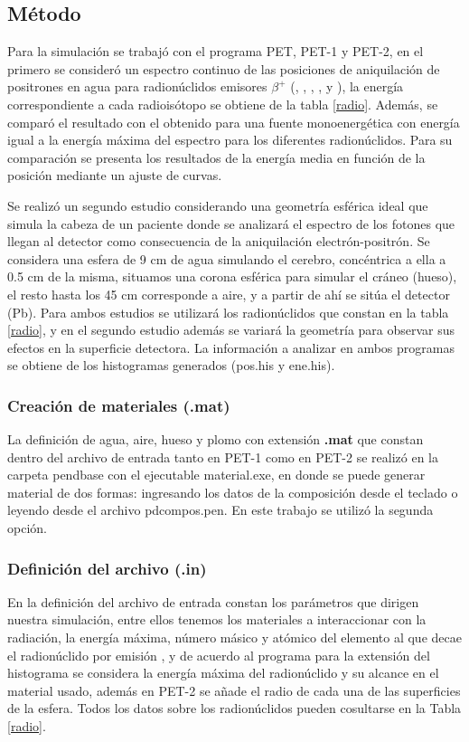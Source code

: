 \documentclass[12pt,a4paper,onecolumn]{article}
\begin{document}
\subsection*{Método}
Para la simulación se trabajó con el programa PET, PET-1 y PET-2, en el primero se consideró un espectro continuo de las posiciones de aniquilación de positrones en agua para radionúclidos emisores $\beta^+$ (, , , ,  y ), la energía correspondiente a cada radioisótopo se obtiene de la tabla \ref{radio}. Además, se comparó el resultado con el obtenido para una fuente monoenergética con energía igual a la energía máxima del espectro para los diferentes radionúclidos. Para su comparación se presenta los resultados de la energía media en función de la posición mediante un ajuste de curvas.
  
Se realizó un segundo estudio considerando una geometría esférica ideal que simula la cabeza de un paciente donde se analizará el espectro de los fotones que llegan al detector como consecuencia de la aniquilación electrón-positrón. Se considera una esfera de 9 cm de agua simulando el cerebro, concéntrica a ella a 0.5 cm de la misma, situamos una corona esférica para simular el cráneo (hueso), el resto hasta los 45 cm corresponde a aire, y a partir de ahí se sitúa el detector (Pb). Para ambos estudios se utilizará los radionúclidos que constan en la tabla \ref{radio}, y en el segundo estudio además se variará la geometría para observar sus efectos en la superficie detectora. La información a analizar en ambos programas se obtiene de los histogramas generados (pos.his y ene.his).

\subsubsection*{Creación de materiales (.mat)}
La definición de agua, aire, hueso y plomo con extensión \textbf{.mat} que constan dentro del archivo de entrada tanto en PET-1 como en PET-2 se realizó en la carpeta pendbase con el ejecutable material.exe, en donde se puede generar material de dos formas: ingresando los datos de la composición desde el teclado o leyendo desde el archivo pdcompos.pen. En este trabajo se utilizó la segunda opción.

\subsubsection*{Definición del archivo (.in)}
En la definición del archivo de entrada constan los parámetros que dirigen nuestra simulación, entre ellos tenemos los materiales a interaccionar con la radiación, la energía máxima, número másico y atómico del elemento al que decae el radionúclido por emisión \ce{\beta^+}, y de acuerdo al programa para la extensión del histograma se considera la energía máxima del radionúclido y su alcance en el material usado, además en PET-2 se añade el radio de cada una de las superficies de la esfera. Todos los datos sobre los radionúclidos pueden cosultarse en la Tabla \ref{radio}.
\end{document}
